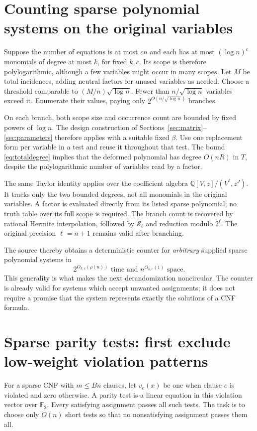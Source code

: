 \documentclass[11pt,a4paper]{article}
\numberwithin{equation}{section}
\theoremstyle{definition}
\theoremstyle{remark}
\newcommand{\Q}{\mathbb Q}
\newcommand{\F}{\mathbb F}
\begin{document}
\section{Counting sparse polynomial systems on the original variables}
\label{sec:sparsecounter}
Suppose the number of equations is at most $cn$ and each has at most
$(\log n)^c$ monomials of degree at most $k$, for fixed $k,c$.
Its scope is therefore polylogarithmic, although a few variables might occur
in many scopes. Let $M$ be total incidences, adding neutral factors for unused
variables as needed. Choose a threshold comparable to
$(M/n)\sqrt{\log n}$. Fewer than $n/\sqrt{\log n}$ variables exceed it.
Enumerate their values, paying only $2^{O(n/\sqrt{\log n})}$ branches.

On each branch, both scope size and occurrence count are bounded by fixed
powers of $\log n$. The design construction of Sections~\ref{sec:matrix}--
\ref{sec:parameters} therefore applies with a suitable fixed $\beta$.
Use one replacement form per variable in a test and reuse it throughout that
test. The bound \eqref{eq:totaldegree} implies that the deformed polynomial
has degree $O(nR)$ in $T$, despite the polylogarithmic number of variables
read by a factor.

The same Taylor identity applies over the coefficient algebra
$\Q[V,z]/(V^\ell,z^J)$. It tracks only the two bounded degrees, not all
monomials in the original variables. A factor is evaluated directly from its
listed sparse polynomial; no truth table over its full scope is required.
The branch count is recovered by rational Hermite interpolation, followed by
$\mathcal S_\ell$ and reduction modulo $2^\ell$. The original precision
$\ell=n+1$ remains valid after branching.

The source thereby obtains a deterministic counter for \emph{arbitrary}
supplied sparse polynomial systems in
\begin{equation}\label{eq:sparsecounter}
 2^{O_{k,c}(\rho(n))}\text{ time and }n^{O_{k,c}(1)}\text{ space}.
\end{equation}
This generality is what makes the next derandomization noncircular. The
counter is already valid for systems which accept unwanted assignments; it
does not require a promise that the system represents exactly the solutions
of a CNF formula.

\section{Sparse parity tests: first exclude low-weight violation patterns}
\label{sec:expander}
For a sparse CNF with $m\le Bn$ clauses, let
$v_e(x)$ be one when clause $e$ is violated and zero otherwise. A parity test
is a linear equation in this violation vector over $\F_2$.
Every satisfying assignment passes all such tests. The task is to choose only
$O(n)$ short tests so that no nonsatisfying assignment passes them all.
\end{document}
